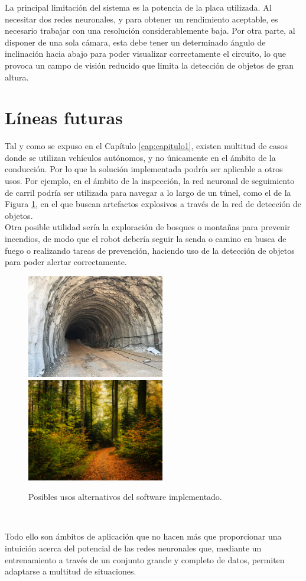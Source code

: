 La principal limitación del sistema es la potencia de la placa utilizada. Al necesitar dos redes neuronales, y para obtener un rendimiento aceptable, es necesario trabajar con una resolución considerablemente baja. Por otra parte, al disponer de una sola cámara, esta debe tener un determinado ángulo de inclinación hacia abajo para poder visualizar correctamente el circuito, lo que provoca un campo de visión reducido que limita la detección de objetos de gran altura.

\section{Líneas futuras}
\label{section:future}
Tal y como se expuso en el Capítulo \ref{cap:capitulo1}, existen multitud de casos donde se utilizan vehículos autónomos, y no únicamente en el ámbito de la conducción. Por lo que la solución implementada podría ser aplicable a otros usos. Por ejemplo, en el ámbito de la inspección, la red neuronal de seguimiento de carril podría ser utilizada para navegar a lo largo de un túnel, como el de la Figura \ref{fig:moreusages}, en el que buscan artefactos explosivos a través de la red de detección de objetos.\\

Otra posible utilidad sería la exploración de bosques o montañas para prevenir incendios, de modo que el robot debería seguir la senda o camino en busca de fuego o realizando tareas de prevención, haciendo uso de la detección de objetos para poder alertar correctamente.

\begin{figure} [h!]
	\begin{center}
		\includegraphics[width=6cm]{figs/tunel}\hspace{0.5cm}\includegraphics[width=6cm]{figs/forest}
	\end{center}
	\caption{Posibles usos alternativos del software implementado.}
	\label{fig:moreusages}
\end{figure}\

Todo ello son ámbitos de aplicación que no hacen más que proporcionar una intuición acerca del potencial de las redes neuronales que, mediante un entrenamiento a través de un conjunto grande y completo de datos, permiten adaptarse a multitud de situaciones.\\